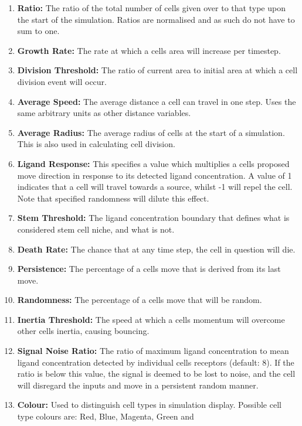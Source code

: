 \documentclass[11.5pt]{article}
\begin{document}
\begin{enumerate}
\item {\bfseries Ratio: }The ratio of the total number of cells given 
over to that type upon the start of the simulation. Ratios are 
normalised and as such do not have to sum to one.
\item {\bfseries Growth Rate: }The rate at which a cells area will 
increase per timestep.
\item {\bfseries Division Threshold: }The ratio of current area to 
initial area at which a cell division event will occur.
\item {\bfseries Average Speed: }The average distance a cell can travel 
in one step. Uses the same arbitrary units as other distance variables.
\item {\bfseries Average Radius: }The average radius of cells at the 
start of a simulation. This is also used in calculating cell division.
\item {\bfseries Ligand Response: }This specifies a value which 
multiplies a cells proposed move direction in response to its detected 
ligand concentration. A value of 1 indicates that a cell will travel 
towards a source, whilst -1 will repel the cell. Note that specified 
randomness will dilute this effect.
\item {\bfseries Stem Threshold: }The ligand concentration boundary that 
defines what is considered stem cell niche, and what is not.
\item {\bfseries Death Rate: }The chance that at any time step, the cell 
in question will die.
\item {\bfseries Persistence: }The percentage of a cells move that is 
derived from its last move.
\item {\bfseries Randomness: }The percentage of a cells move that will be 
random.
\item {\bfseries Inertia Threshold: }The speed at which a cells momentum 
will overcome other cells inertia, causing bouncing.
\item {\bfseries Signal Noise Ratio: }The ratio of maximum ligand 
concentration to mean ligand concentration detected by individual cells 
receptors (default: 8). If the ratio is below this value, the signal is 
deemed to be lost to noise, and the cell will disregard the inputs and 
move in a persistent random manner.
\item {\bfseries Colour:} Used to distinguish cell types in simulation 
display. Possible cell type colours are: Red, Blue, Magenta, Green and 

\end{enumerate}
\end{document}
